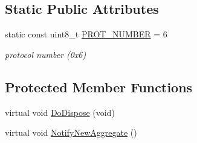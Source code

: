 \subsection*{Static Public Attributes}
\begin{DoxyCompactItemize}
\item 
static const uint8\+\_\+t \hyperlink{classns3_1_1NscTcpL4Protocol_afad61be589382ee316540dfa856d6f5b}{P\+R\+O\+T\+\_\+\+N\+U\+M\+B\+ER} = 6
\begin{DoxyCompactList}\small\item\em protocol number (0x6) \end{DoxyCompactList}\end{DoxyCompactItemize}
\subsection*{Protected Member Functions}
\begin{DoxyCompactItemize}
\item 
virtual void \hyperlink{classns3_1_1NscTcpL4Protocol_ab3f77171a13c3e8f96717f26a6b716b9}{Do\+Dispose} (void)
\item 
virtual void \hyperlink{classns3_1_1NscTcpL4Protocol_a423e33bc38d6f04ba6c54f7ce2647565}{Notify\+New\+Aggregate} ()
\end{DoxyCompactItemize}
